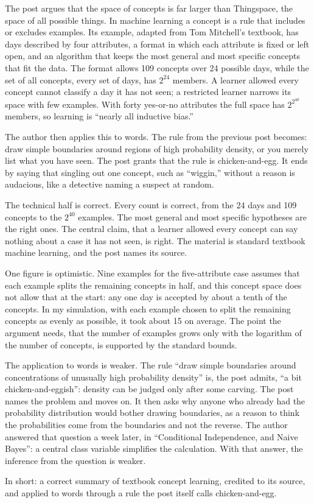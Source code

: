 \begin{afterword}
\summaryhead

The post argues that the space of concepts is far larger than Thingspace, the space of all possible things. In machine learning a concept is a rule that includes or excludes examples. Its example, adapted from Tom Mitchell's textbook, has days described by four attributes, a format in which each attribute is fixed or left open, and an algorithm that keeps the most general and most specific concepts that fit the data. The format allows 109 concepts over 24 possible days, while the set of all concepts, every set of days, has $2^{24}$ members. A learner allowed every concept cannot classify a day it has not seen; a restricted learner narrows its space with few examples. With forty yes-or-no attributes the full space has $2^{2^{40}}$ members, so learning is ``nearly all inductive bias.''

The author then applies this to words. The rule from the previous post becomes: draw simple boundaries around regions of high probability density, or you merely list what you have seen. The post grants that the rule is chicken-and-egg. It ends by saying that singling out one concept, such as ``wiggin,'' without a reason is audacious, like a detective naming a suspect at random.

\responsehead

The technical half is correct. Every count is correct, from the 24 days and 109 concepts to the $2^{40}$ examples. The most general and most specific hypotheses are the right ones. The central claim, that a learner allowed every concept can say nothing about a case it has not seen, is right. The material is standard textbook machine learning, and the post names its source.

One figure is optimistic. Nine examples for the five-attribute case assumes that each example splits the remaining concepts in half, and this concept space does not allow that at the start: any one day is accepted by about a tenth of the concepts. In my simulation, with each example chosen to split the remaining concepts as evenly as possible, it took about 15 on average. The point the argument needs, that the number of examples grows only with the logarithm of the number of concepts, is supported by the standard bounds.

The application to words is weaker. The rule ``draw simple boundaries around concentrations of unusually high probability density'' is, the post admits, ``a bit chicken-and-eggish'': density can be judged only after some carving. The post names the problem and moves on. It then asks why anyone who already had the probability distribution would bother drawing boundaries, as a reason to think the probabilities come from the boundaries and not the reverse. The author answered that question a week later, in ``Conditional Independence, and Naive Bayes'': a central class variable simplifies the calculation. With that answer, the inference from the question is weaker.

In short: a correct summary of textbook concept learning, credited to its source, and applied to words through a rule the post itself calls chicken-and-egg.
\end{afterword}

